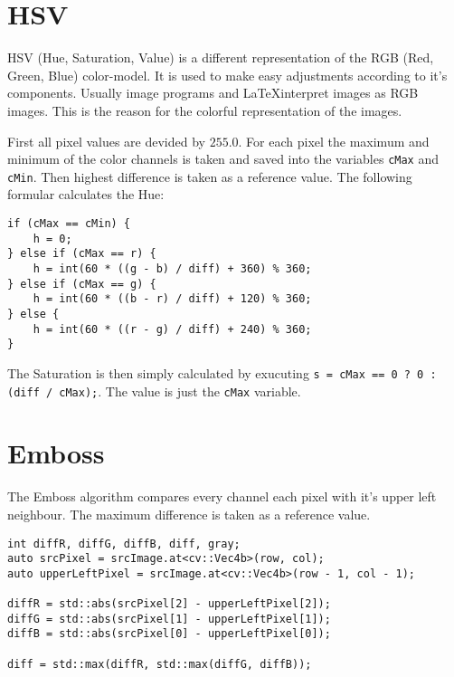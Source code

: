 \section{HSV}

HSV (Hue, Saturation, Value) is a different representation of the RGB (Red, Green, Blue) color-model. It is used to make easy adjustments according to it's components. Usually image programs and \LaTeX \space interpret images as RGB images. This is the reason for the colorful representation of the images.

First all pixel values are devided by $ 255.0 $. For each pixel the maximum and minimum of the color channels is taken and saved into the variables \texttt{cMax} and \texttt{cMin}. Then highest difference is taken as a reference value. The following formular calculates the Hue:

\begin{listing}[H]
\begin{verbatim}
if (cMax == cMin) {
    h = 0;
} else if (cMax == r) {
    h = int(60 * ((g - b) / diff) + 360) % 360;
} else if (cMax == g) {
    h = int(60 * ((b - r) / diff) + 120) % 360;
} else {
    h = int(60 * ((r - g) / diff) + 240) % 360;
}
\end{verbatim}
\label{listing:hsv1}
\end{listing}


The Saturation is then simply calculated by exucuting \texttt{s = cMax == 0 ? 0 : (diff / cMax);}. The value is just the  \texttt{cMax} variable.

\section{Emboss}

The Emboss algorithm compares every channel each pixel with it's upper left neighbour. The maximum difference is taken as a reference value.


\begin{listing}[H]
\begin{verbatim}
int diffR, diffG, diffB, diff, gray;
auto srcPixel = srcImage.at<cv::Vec4b>(row, col);
auto upperLeftPixel = srcImage.at<cv::Vec4b>(row - 1, col - 1);

diffR = std::abs(srcPixel[2] - upperLeftPixel[2]);
diffG = std::abs(srcPixel[1] - upperLeftPixel[1]);
diffB = std::abs(srcPixel[0] - upperLeftPixel[0]);

diff = std::max(diffR, std::max(diffG, diffB));
\end{verbatim}
\label{listing:emboss1}
\end{listing}

